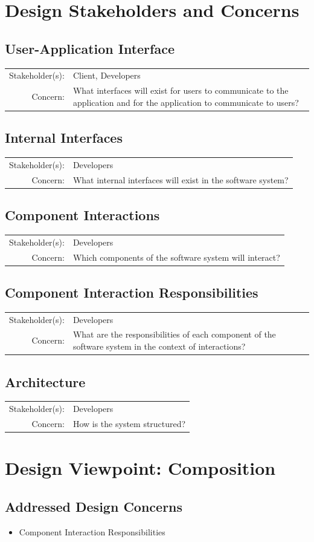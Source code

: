 \documentclass[onecolumn, draftclsnofoot,10pt, compsoc]{IEEEtran}
\newcommand{\designConcernDef}[3]{
    \subsection{#1}
        \begin{tabular}[t]{r p{6in}}
            Stakeholder(s): & #2 \\
            Concern: & #3 \\
        \end{tabular}
}
\newcommand{\designConcernRef}[2][]{
    #2 #1
}
\begin{document}
\section{Design Stakeholders and Concerns}
    \designConcernDef{User-Application Interface}{Client, Developers}{What interfaces will exist for users to communicate to the application and for the application to communicate to users?}
    \designConcernDef{Internal Interfaces}{Developers}{What internal interfaces will exist in the software system?}
    \designConcernDef{Component Interactions}{Developers}{Which components of the software system will interact?}
    \designConcernDef{Component Interaction Responsibilities}{Developers}{What are the responsibilities of each component of the software system in the context of interactions?}
	\designConcernDef{Architecture}{Developers}{How is the system structured?}

%
%
%
\section{Design Viewpoint: Composition}
    \subsection{Addressed Design Concerns}
        \begin{itemize}
            \item \designConcernRef[]{Component Interaction Responsibilities}
        \end{itemize}
\end{document}
